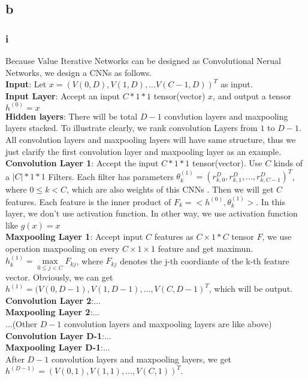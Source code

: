 \documentclass{article}
\begin{document}
	\subsection{b}
	\subsubsection{i}
	Because Value Iterative Networks can be designed as Convolutional Nerual Networks, we design a CNNs as follows.\\
	\textbf{Input}: Let $x = (V(0,D),V(1,D),...V(C-1,D))^T$ as input.\\
	\textbf{Input Layer}: Accept an input $C*1*1$ tensor(vector) $x$, and output a tensor $h^{(0)}=x$\\
	\textbf{Hidden layers}: There will be total $D-1$ convlution layers and maxpooling layers stacked. To illustrate clearly, we rank convolution Layers from $1$ to $D-1$. All convolution layers and maxpooling layers will have same structure, thus we just clarify the first convolution layer and maxpooling layer as an example.\\

	\indent\textbf{Convolution Layer 1}: Accept the input $C*1*1$ tensor(vector). Use $C$ kinds of a $|C|*1*1$ Filters. Each filter has parameters $\theta^{(1)}_k = (r_{k,0}^D, r_{k,1}^D,...,r_{k,C-1}^D)^T$, where $0 \leq k < C$, which are also weights of this CNNs . Then we will get $C$ features. Each feature is the inner product of $F_k = <h^{(0)}, \theta^{(1)}_k>$. In this layer, we don't use activation function. In other way, we use activation function like $g(x)=x$\\
	\indent\textbf{Maxpooling Layer 1}: Accept input $C$ features as $C \times 1 * C$ tensor $F$, we use operation maxpooling on every $C \times 1 \times 1$ feature and get maximun. $h^{(1)}_k = \max\limits_{0 \leq j < C}{F_{kj}}$, where $F_{kj}$ denotes the j-th coordiante of the k-th feature vector. Obviously, we can get $h^{(1)} = (V(0,D-1),V(1,D-1),...,V(C,D-1)^T$, which will be output.\\
	\indent\textbf{Convolution Layer 2}:...\\
	\indent\textbf{Maxpooling Layer 2}:...\\
	\indent...(Other $D-1$ convolution layers and maxpooling layers are like above)\\
	\indent\textbf{Convolution Layer D-1}:...\\
	\indent\textbf{Maxpooling Layer D-1}:...\\
	\indent After $D-1$ convolution layers and maxpooling layers, we get $h^{(D-1)} = (V(0,1),V(1,1),...,V(C,1))^T$.\\
	
\end{document}
